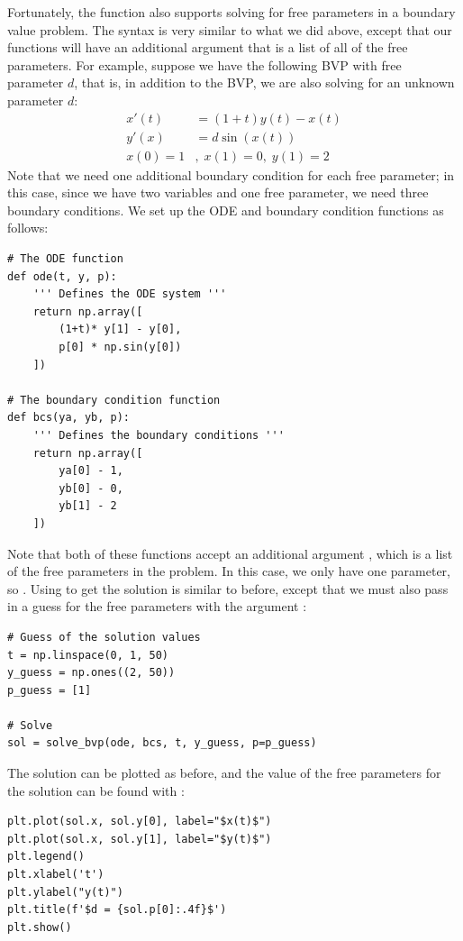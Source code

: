 Fortunately, the function  also supports solving for free parameters in a boundary value problem.
The syntax is very similar to what we did above, except that our functions will have an additional argument that is a list of all of the free parameters.
For example, suppose we have the following BVP with free parameter \(d\), that is, in addition to the BVP, we are also solving for an unknown parameter \(d\):
\begin{align*}
x'(t) &= (1+t)y(t)-x(t) \\
y'(x) &= d\sin(x(t))
\\
x(0)=1&,\; x(1)=0,\; y(1)=2
\end{align*}
Note that we need one additional boundary condition for each free parameter; in this case, since we have two variables and one free parameter, we need three boundary conditions.
We set up the ODE and boundary condition functions as follows:
\begin{lstlisting}
# The ODE function
def ode(t, y, p):
    ''' Defines the ODE system '''
    return np.array([
        (1+t)* y[1] - y[0],
        p[0] * np.sin(y[0])
    ])

# The boundary condition function
def bcs(ya, yb, p):
    ''' Defines the boundary conditions '''
    return np.array([
        ya[0] - 1,
        yb[0] - 0,
        yb[1] - 2
    ])
\end{lstlisting}
Note that both of these functions accept an additional argument , which is a list of the free parameters in the problem.
In this case, we only have one parameter, so .
Using  to get the solution is similar to before, except that we must also pass in a guess for the free parameters with the argument :
\begin{lstlisting}
# Guess of the solution values
t = np.linspace(0, 1, 50)
y_guess = np.ones((2, 50))
p_guess = [1]

# Solve
sol = solve_bvp(ode, bcs, t, y_guess, p=p_guess)
\end{lstlisting}
The solution can be plotted as before, and the value of the free parameters for the solution can be found with :
\begin{lstlisting}
plt.plot(sol.x, sol.y[0], label="$x(t)$")
plt.plot(sol.x, sol.y[1], label="$y(t)$")
plt.legend()
plt.xlabel('t')
plt.ylabel("y(t)")
plt.title(f'$d = {sol.p[0]:.4f}$')
plt.show()
\end{lstlisting}


